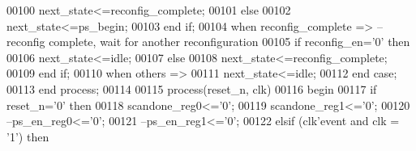 \begin{DoxyCode}
00100                 \textcolor{vhdlchar}{next_state}\textcolor{vhdlchar}{<=}\textcolor{vhdlchar}{reconfig\_complete};
00101             \textcolor{keywordflow}{else} 
00102                 \textcolor{vhdlchar}{next_state}\textcolor{vhdlchar}{<=}\textcolor{vhdlchar}{ps\_begin};
00103             \textcolor{keywordflow}{end} \textcolor{keywordflow}{if};
00104         \textcolor{keywordflow}{when} \textcolor{vhdlchar}{reconfig\_complete} \textcolor{vhdlchar}{=}\textcolor{vhdlchar}{>}\textcolor{keyword}{ --reconfig complete, wait for another reconfiguration}
00105             \textcolor{keywordflow}{if} \textcolor{vhdlchar}{reconfig_en}\textcolor{vhdlchar}{=}\textcolor{vhdlchar}{'}\textcolor{vhdllogic}{}\textcolor{vhdllogic}{0}\textcolor{vhdlchar}{'} \textcolor{keywordflow}{then} 
00106                 \textcolor{vhdlchar}{next_state}\textcolor{vhdlchar}{<=}\textcolor{vhdlchar}{idle};
00107             \textcolor{keywordflow}{else} 
00108                 \textcolor{vhdlchar}{next_state}\textcolor{vhdlchar}{<=}\textcolor{vhdlchar}{reconfig\_complete};
00109             \textcolor{keywordflow}{end} \textcolor{keywordflow}{if};
00110         \textcolor{keywordflow}{when} \textcolor{keywordflow}{others} \textcolor{vhdlchar}{=}\textcolor{vhdlchar}{>} 
00111             \textcolor{vhdlchar}{next_state}\textcolor{vhdlchar}{<=}\textcolor{vhdlchar}{idle};
00112     \textcolor{keywordflow}{end} \textcolor{keywordflow}{case};
00113 \textcolor{keywordflow}{end} \textcolor{keywordflow}{process};
00114 
00115 \textcolor{keywordflow}{process}(reset_n, clk)
00116 \textcolor{vhdlkeyword}{    begin}
00117       \textcolor{keywordflow}{if} \textcolor{vhdlchar}{reset_n}\textcolor{vhdlchar}{=}\textcolor{vhdlchar}{'}\textcolor{vhdllogic}{}\textcolor{vhdllogic}{0}\textcolor{vhdlchar}{'} \textcolor{keywordflow}{then}
00118         \textcolor{vhdlchar}{scandone_reg0}\textcolor{vhdlchar}{<=}\textcolor{vhdlchar}{'}\textcolor{vhdllogic}{}\textcolor{vhdllogic}{0}\textcolor{vhdlchar}{'};
00119           \textcolor{vhdlchar}{scandone_reg1}\textcolor{vhdlchar}{<=}\textcolor{vhdlchar}{'}\textcolor{vhdllogic}{}\textcolor{vhdllogic}{0}\textcolor{vhdlchar}{'};
00120 \textcolor{keyword}{          --ps\_en\_reg0<='0';}
00121 \textcolor{keyword}{          --ps\_en\_reg1<='0';}
00122         \textcolor{keywordflow}{elsif} \textcolor{vhdlchar}{(}\textcolor{vhdlchar}{clk}\textcolor{vhdlchar}{'}\textcolor{vhdlkeyword}{event} \textcolor{keywordflow}{and} \textcolor{vhdlchar}{clk} \textcolor{vhdlchar}{=} \textcolor{vhdlchar}{'}\textcolor{vhdllogic}{}\textcolor{vhdllogic}{1}\textcolor{vhdlchar}{'}\textcolor{vhdlchar}{)} \textcolor{keywordflow}{then}

\end{DoxyCode}
